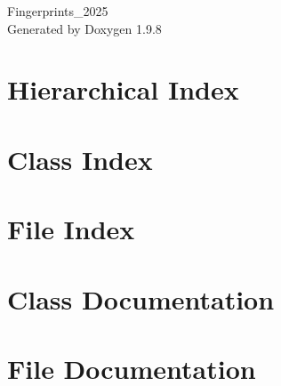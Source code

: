 \documentclass[twoside]{book}
\newcommand{\+}{\discretionary{\mbox{\scriptsize$\hookleftarrow$}}{}{}}
\newcommand{\clearemptydoublepage}{%
    \newpage{\pagestyle{empty}\cleardoublepage}%
  }
\begin{document}
  \raggedbottom
    \hypersetup{pageanchor=false,
                bookmarksnumbered=true,
                pdfencoding=unicode
               }
  \begin{titlepage}
  \vspace*{7cm}
  \begin{center}%
  {\Large Fingerprints\+\_\+2025}\\
  \vspace*{1cm}
  {\large Generated by Doxygen 1.9.8}\\
  \end{center}
  \end{titlepage}
  \clearemptydoublepage
  \tableofcontents
  \clearemptydoublepage
  \hypersetup{pageanchor=true}
\chapter{Hierarchical Index}

\chapter{Class Index}

\chapter{File Index}

\chapter{Class Documentation}




\chapter{File Documentation}






  \backmatter
  \newpage
  \clearemptydoublepage
  \printindex
\end{document}
